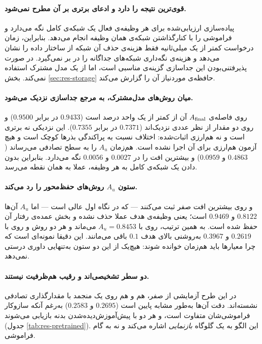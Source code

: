 \paragraph{ قوی‌ترین نتیجه را دارد و ادعای برتری بر آن مطرح نمی‌شود.} پیاده‌سازی ارزیابی‌شده برای هر وظیفه‌ی فعال یک شبکه‌ی کامل نگه می‌دارد و فراموشی را با کنارگذاشتن شبکه‌ی همان وظیفه انجام می‌دهد. بنابراین، زمان درخواست کمتر از یک میلی‌ثانیه فقط هزینه‌ی حذف آن شبکه از ساختار داده را نشان می‌دهد و هزینه‌ی نگه‌داری شبکه‌های جداگانه را در بر نمی‌گیرد.  در صورت پذیرفتنی‌بودن این جداسازی گزینه‌ی مناسبی است، اما از یک مدل مشترک استفاده نمی‌کند. بخش \ref{sec:res-storage} حافظه‌ی موردنیاز آن را گزارش می‌کند.

\paragraph{میان روش‌های مدل‌مشترک،  به مرجع جداسازی نزدیک می‌شود.} روی  فاصله‌ی $A_{\mathrm{final}}$ آن از  کمتر از یک واحد درصد است ($0.9433$ در برابر $0.9500$) و روی  دو مقدار از نظر عددی نزدیک‌اند ($0.7371$ در برابر $0.7355$). این نزدیکی نه برتری است و نه هم‌ارزی اثبات‌شده: اختلاف نسبت به پراکندگی بذرها کوچک است و هیچ آزمون هم‌ارزی برای آن اجرا نشده است. هم‌زمان $A_u$ را به سطح تصادفی می‌رساند ($0.4863$ و $0.0959$) و بیشترین افت را در $0.0027$ و $0.0056$ نگه می‌دارد. بنابراین بدون دادن یک شبکه‌ی کامل به هر وظیفه، عملا به همان نقطه می‌رسد.

\paragraph{ستون $A_u$ روش‌های حفظ‌محور را رد می‌کند.}  و  روی  بیشترین افت صفر ثبت می‌کنند — که در نگاه اول عالی است — اما $A_u$ آن‌ها $0.8122$ و $0.9469$ است؛ یعنی وظیفه‌ی هدف عملا حذف نشده و بخش عمده‌ی رفتار آن حفظ شده است. به همین ترتیب،  روی  با $A_u=0.8453$ می‌ماند و هر دو روش  و  روی  با $0.2619$ و $0.3967$ به‌روشنی بالای هدف $0.1$ باقی می‌مانند. این دقیقا نمونه‌ای است که چرا معیارها باید هم‌زمان خوانده شوند: هیچ‌یک از این دو ستون به‌تنهایی داوری درستی نمی‌دهد.

\paragraph{دو سطر  تشخیصی‌اند و رقیب هم‌ظرفیت نیستند.} در این طرح آزمایشی از صفر، هم  و هم  روی یک  منجمد با مقدارگذاری تصادفی نشسته‌اند. دقت  آن‌ها به‌طور مشابه پایین است ($0.2695$ و $0.2583$) به‌رغم آنکه سازوکار فراموشی‌شان متفاوت است، و هر دو با پیش‌آموزش‌دیده‌شدن بدنه بازیابی می‌شوند (جدول \ref{tab:res-pretrained}). این الگو به یک گلوگاه \emph{بازنمایی} اشاره می‌کند و نه به گام فراموشی.

